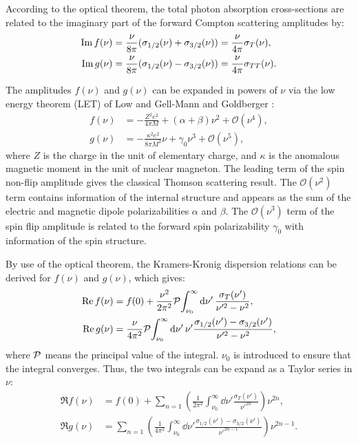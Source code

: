 According to the optical theorem, the total photon absorption cross-sections are related to the imaginary part of the forward Compton scattering amplitudes by:
\begin{equation} \label{C2S4SS2E9}
\begin{split}
\Im f(\nu) & = \frac{\nu}{8\pi}(\sigma_{1/2}(\nu)+\sigma_{3/2}(\nu)) = \frac{\nu}{4\pi}\sigma_T(\nu), \\
\Im g(\nu) & = \frac{\nu}{8\pi}(\sigma_{1/2}(\nu)-\sigma_{3/2}(\nu)) = \frac{\nu}{4\pi}\sigma_{TT}(\nu).
\end{split}
\end{equation}

The amplitudes $f(\nu)$ and $g(\nu)$ can be expanded in powers of $\nu$ via the low energy theorem (LET) of Low \cite{Low1954} and Gell-Mann and Goldberger \cite{Gellmann1954b}:
\begin{align} \label{C2S4SS2E10}
f(\nu) & = -\frac{Z^2e^2}{4\pi M}+(\alpha+\beta)\nu^2+\mathcal{O}(\nu^4), \\ \label{C2S4SS2E11}
g(\nu) & = -\frac{\kappa^2e^2}{8\pi M^2}\nu+\gamma_0\nu^3+\mathcal{O}(\nu^5),
\end{align}
where $Z$ is the charge in the unit of elementary charge, and $\kappa$ is the anomalous magnetic moment in the unit of nuclear magneton. The leading term of the spin non-flip amplitude gives the classical Thomson scattering result. The $\mathcal{O}(\nu^2)$ term contains information of the internal structure and appears as the sum of the electric and magnetic dipole polarizabilities $\alpha$ and $\beta$. The $\mathcal{O}(\nu^3)$ term of the spin flip amplitude is related to the forward spin polarizability $\gamma_0$ with information of the spin structure.

By use of the optical theorem, the Kramers-Kronig dispersion relations can be derived for $f(\nu)$ and $g(\nu)$, which gives:
\begin{align} \label{C2S4SS2E12}
\Re f(\nu) & = f(0)+\frac{\nu^2}{2\pi^2}\pv{\int_{\nu_0}^\infty\dd{\nu'}\frac{\sigma_T(\nu')}{\nu'^2-\nu^2}}, \\ \label{C2S4SS2E13}
\Re g(\nu) & = \frac{\nu}{4\pi^2}\pv{\int_{\nu_0}^\infty\dd{\nu'}\nu'\frac{\sigma_{1/2}(\nu')-\sigma_{3/2}(\nu')}{\nu'^2-\nu^2}},
\end{align}
where $\pv$ means the principal value of the integral. $\nu_0$ is introduced to ensure that the integral converges. Thus, the two integrals can be expand as a Taylor series in $\nu$:
\begin{align} \label{C2S4SS2E14}
\Re f(\nu) & = f(0)+\sum_{n=1}\left(\frac{1}{2\pi^2}\int_{\nu_0}^\infty\dd{\nu'}\frac{\sigma_T(\nu')}{\nu'^{2n}}\right)\nu^{2n}, \\ \label{C2S4SS2E15}
\Re g(\nu) & = \sum_{n=1}\left(\frac{1}{4\pi^2}\int_{\nu_0}^\infty\dd{\nu'}\frac{\sigma_{1/2}(\nu')-\sigma_{3/2}(\nu')}{\nu'^{2n-1}}\right)\nu^{2n-1}.
\end{align}

